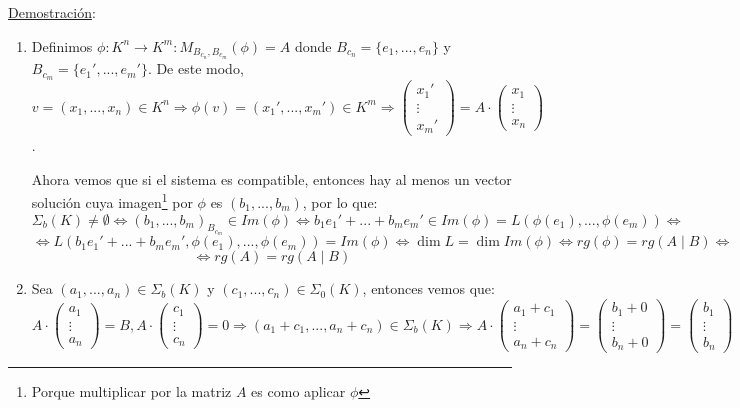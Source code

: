 \documentclass[10pt,a4paper,openright]{book}
\begin{document}
\underline{Demostración}:
\begin{enumerate}
\item Definimos $\phi: K^n\longrightarrow K^m: M_{B_{c_n}, B_{c_m}}(\phi)=A$ donde $B_{c_n}=\{e_1, ..., e_n\}$ y $B_{c_m}=\{e_1', ..., e_m'\}$. De este modo, $v=(x_1, ..., x_n)\in K^n\Rightarrow \phi(v)=(x_1', ..., x_m')\in K^m\Rightarrow \begin{pmatrix}
x_1' \\ \vdots \\ x_m'
\end{pmatrix}=A\cdot \begin{pmatrix}
x_1 \\ \vdots \\ x_n
\end{pmatrix}$.

Ahora vemos que si el sistema es compatible, entonces hay al menos un vector solución cuya imagen\footnote{Porque multiplicar por la matriz $A$ es como aplicar $\phi$} por $\phi$ es $(b_1, ..., b_m)$, por lo que:
$$\Sigma_b(K)\neq \emptyset \Leftrightarrow (b_1, ..., b_m)_{B_{c_m}}\in Im(\phi)\Leftrightarrow b_1e_1'+...+b_me_m'\in Im(\phi)=L\left(\phi(e_1), ..., \phi(e_m)\right)\Leftrightarrow $$
$$\Leftrightarrow L\left(b_1e_1'+...+b_me_m',\phi(e_1), ..., \phi(e_m)\right)=Im(\phi)\Leftrightarrow \dim L=\dim Im(\phi)\Leftrightarrow rg(\phi)=rg(A\mid B)\Leftrightarrow$$
$$\Leftrightarrow rg(A)=rg(A\mid B)$$

\item Sea $(a_1, ..., a_n)\in \Sigma_b(K)$ y $(c_1, ..., c_n)\in \Sigma_0(K)$, entonces vemos que:
$$A\cdot \begin{pmatrix}
a_1 \\ \vdots \\ a_n
\end{pmatrix}=B, A\cdot \begin{pmatrix}
c_1 \\ \vdots \\ c_n
\end{pmatrix}=0 \Rightarrow (a_1+c_1, ..., a_n+c_n)\in \Sigma_b(K)\Rightarrow A\cdot \begin{pmatrix}
a_1+c_1 \\ \vdots \\ a_n+c_n
\end{pmatrix}=\begin{pmatrix}
b_1+0 \\ \vdots \\ b_n+0
\end{pmatrix}=\begin{pmatrix}
b_1 \\ \vdots \\ b_n
\end{pmatrix}$$
\end{enumerate}
\end{document}

